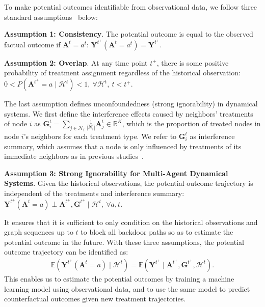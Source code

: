 To make potential outcomes identifiable from observational data, we follow three standard assumptions~\cite{BicaAJS20,seedat2022continuous,anonymous2023cfgode} below:

\textbf{Assumption 1: Consistency}. The potential outcome is equal to the observed factual outcome if $\mathbf{A}^{t} = a^{t} $: $\mathbf{Y}^{t^+}(\mathbf{A}^{t}=a^{t}) = \mathbf{Y}^{t^+}$.


\textbf{Assumption 2: Overlap}. At any time point $t^+$, there is some positive probability of treatment assignment regardless of the historical observation: $0 < P(\mathbf{A}^{t^+}=a\mid \mathcal{H}^t) < 1,~\forall \mathcal{H}^t,~t<t^+$.

The last assumption defines unconfoundedness (strong ignorability) in  dynamical systems. 
We first define the interference effects caused by neighbors' treatments of node $i$ as $\mathbf{G}_{i}^t =\sum_{j\in \mathcal{N}_i}\frac{1}{|N_i|} \mathbf{A}_j^t\in \mathbb{R}^{K}$, which is the proportion of treated nodes in node $i$'s neighbors for each treatment type. 
We refer to $\mathbf{G}_i^t$ as interference summary, which assumes that a node is only influenced by treatments of its immediate neighbors as in previous studies~\cite{anonymous2023cfgode,ma2022learning, jiang2022estimating}. 


\textbf{Assumption 3: Strong Ignorability for Multi-Agent Dynamical Systems}. Given the historical observations, the potential outcome trajectory is independent of the treatments and interference summary: $\mathbf{Y}^{t^+}(\mathbf{A}^{t}=a) \perp \mathbf{A}^{t^+}, \mathbf{G}^{t^+} \mid \mathcal{H}^t,~\forall a, t$.

It ensures that it is sufficient to only condition on the historical observations and graph sequences up to $t$ to block all backdoor paths so as to estimate the potential outcome in the future. With these three assumptions, the potential outcome trajectory can be identified as: 
\begin{align*}
    \mathbb{E}\left(\mathbf{Y}^{t^+}(\mathbf{A}^{t}=a)\mid \mathcal{H}^t\right) = \mathbb{E}\left(\mathbf{Y}^{t^+}\mid \mathbf{A}^{t^+}, \mathbf{G}^{t^+}, \mathcal{H}^t\right).
\end{align*}
This enables us to estimate the potential outcomes by training a machine learning model using observational data, and to use the same model to predict counterfactual outcomes given new treatment trajectories. 
